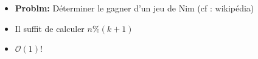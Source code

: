 \begin{frame}
    \frametitle{\problemtitle}
    \begin{itemize}
        \item<+-> \textbf{Problm:} Déterminer le gagner d'un jeu de Nim (cf : wikipédia)
        \item<+-> Il suffit de calculer $n \% (k + 1)$
        \item<+-> $\mathcal O(1)$!
    \end{itemize}
\end{frame}
